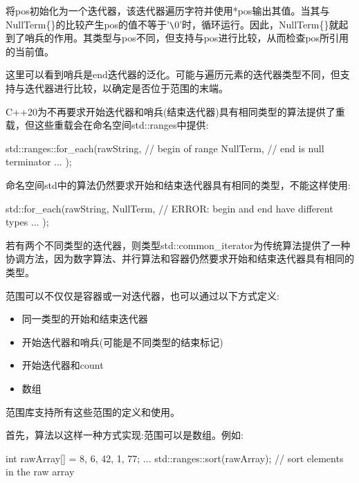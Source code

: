 将pos初始化为一个迭代器，该迭代器遍历字符并使用*pos输出其值。当其与NullTerm\{\}的比较产生pos的值不等于'\verb|\|0'时，循环运行。因此，NullTerm\{\}就起到了哨兵的作用。其类型与pos不同，但支持与pos进行比较，从而检查pos所引用的当前值。

这里可以看到哨兵是end迭代器的泛化。可能与遍历元素的迭代器类型不同，但支持与迭代器进行比较，以确定是否位于范围的末端。


C++20为不再要求开始迭代器和哨兵(结束迭代器)具有相同类型的算法提供了重载，但这些重载会在命名空间std::ranges中提供:

\begin{cpp}
std::ranges::for_each(rawString, // begin of range
						NullTerm{}, // end is null terminator
						... );
\end{cpp}

命名空间std中的算法仍然要求开始和结束迭代器具有相同的类型，不能这样使用:

\begin{cpp}
std::for_each(rawString, NullTerm{}, // ERROR: begin and end have different types
			... );
\end{cpp}

若有两个不同类型的迭代器，则类型std::common\_iterator为传统算法提供了一种协调方法，因为数字算法、并行算法和容器仍然要求开始和结束迭代器具有相同的类型。


范围可以不仅仅是容器或一对迭代器，也可以通过以下方式定义:

\begin{itemize}
\item
同一类型的开始和结束迭代器

\item
开始迭代器和哨兵(可能是不同类型的结束标记)

\item
开始迭代器和count

\item
数组
\end{itemize}

范围库支持所有这些范围的定义和使用。

首先，算法以这样一种方式实现:范围可以是数组。例如:

\begin{cpp}
int rawArray[] = {8, 6, 42, 1, 77};
...
std::ranges::sort(rawArray); // sort elements in the raw array
\end{cpp}

